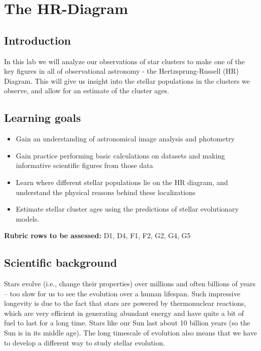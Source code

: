 \chapter{The HR-Diagram}

\section{Introduction}

In this lab we will analyze our observations of star clusters to make one of the key figures in all of observational astronomy - the Hertzsprung-Russell (HR) Diagram. This will give us insight into the stellar populations in the clusters we observe, and allow for an estimate of the cluster ages. 

\section{Learning goals}

\begin{itemize}
    \item Gain an understanding of astronomical image analysis and photometry
	\item Gain practice performing basic calculations on datasets and making informative scientific figures from those data
	\item Learn where different stellar populations lie on the HR diagram, and understand the physical reasons behind these localizations
	\item Estimate stellar cluster ages using the predictions of stellar evolutionary models. 
\end{itemize}

\textbf{Rubric rows to be assessed:} D1, D4, F1, F2, G2, G4, G5

\section{Scientific background}

Stars evolve (i.e., change their properties) over millions and often billions of years – too slow for us to see the evolution over a human lifespan.  Such impressive longevity is due to the fact that stars are powered by thermonuclear reactions, which are very efficient in generating abundant energy and have quite a bit of fuel to last for a long time. Stars like our Sun last about 10 billion years (so the Sun is in its middle age). The long timescale of evolution also means that we have to develop a different way to study stellar evolution. 

